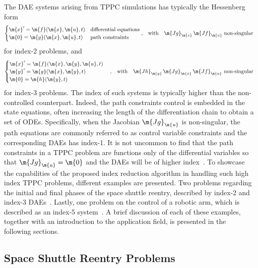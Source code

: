 The \ac{DAE} systems arising from \ac{TPPC} simulations has typically the Hessenberg form~\cite{brenan1986numerical}
%
\begin{equation*}
  \begin{cases}
    \m{x}^\prime = \m{f}(\m{x}, \m{u}, t) & \text{differential equations} \\
    \m{0}        = \m{g}(\m{x}, \m{u}, t) & \text{path constraints}
  \end{cases} \text{,}
  \quad \text{with} \quad \m{Jg}_{\m{x}} \, \m{Jf}_{\m{u}} ~ \text{non-singular}
  \label{chap4:eq:tppc_dae_index2}
\end{equation*}
%
for index-2 problems, and
%
\begin{equation*}
  \begin{cases}
    \m{x}^\prime = \m{f}(\m{x}, \m{y}, \m{u}, t) \\
    \m{y}^\prime = \m{g}(\m{x}, \m{y}, t) \\
    \m{0}        = \m{h}(\m{y}, t)
  \end{cases} \text{,}
  \quad \text{with} \quad \m{Jh}_{\m{y}} \, \m{Jg}_{\m{x}} \, \m{Jf}_{\m{u}} ~ \text{non-singular}
  \label{chap4:eq:tppc_dae_index3}
\end{equation*}
%
for index-3 problems. The index of such systems is typically higher than the non-controlled counterpart. Indeed, the path constraints control is embedded in the state equations, often increasing the length of the differentiation chain to obtain a set of \acp{ODE}. Specifically, when the Jacobian $\m{Jg}_{\m{u}}$ is non-singular, the path equations are commonly referred to as control variable constraints and the corresponding \acp{DAE} has index-1. It is not uncommon to find that the path constraints in a \ac{TPPC} problem are functions only of the differential variables so that $\m{Jg}_{\m{u}} = \m{0}$ and the \acp{DAE} will be of higher index~\cite{brenan1995numerical}. To showcase the capabilities of the proposed index reduction algorithm in handling such high index \ac{TPPC} problems, different examples are presented. Two problems regarding the initial and final phases of the space shuttle reentry, described by index-2 and index-3 \acp{DAE}~\cite{brenan1995numerical}. Lastly, one problem on the control of a robotic arm, which is described as an index-5 system~\cite{pryce1998solving}. A brief discussion of each of these examples, together with an introduction to the application field, is presented in the following sections.

\subsection{Space Shuttle Reentry Problems}

